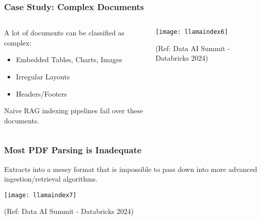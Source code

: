 \begin{frame}[fragile]\frametitle{Case Study: Complex Documents}

\begin{columns}
    \begin{column}[T]{0.4\linewidth}
	A lot of documents can be classified as complex: 

		\begin{itemize}
		\item Embedded Tables, Charts, Images
		\item Irregular Layouts
		\item Headers/Footers
		\end{itemize}	
Naive RAG indexing pipelines fail over these documents.
		
    \end{column}
    \begin{column}[T]{0.6\linewidth}
		\begin{center}
		\texttt{[image: llamaindex6]}

		{\tiny (Ref: Data AI Summit - Databricks 2024)}  
		\end{center}
    \end{column}
  \end{columns}
  
\end{frame}

\begin{frame}[fragile]\frametitle{Most PDF Parsing is Inadequate}
Extracts into a messy format that is impossible to pass down into more advanced ingestion/retrieval algorithms.


\begin{center}
\texttt{[image: llamaindex7]}

{\tiny (Ref: Data AI Summit - Databricks 2024)}
\end{center}
\end{frame}

